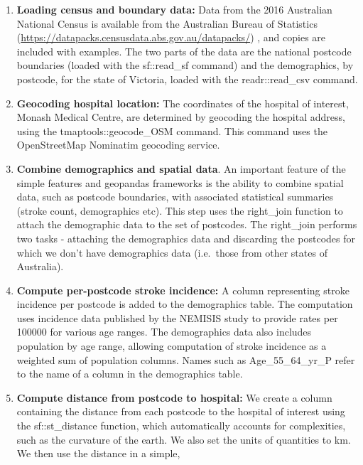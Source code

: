 \documentclass[utf8]{frontiersHLTH}
\begin{document}
\begin{table}[h]
\begin{center}
  \sffamily
  \tiny
\begin{enumerate}
\def\labelenumi{\arabic{enumi}.}
\item
  {\bf Loading census and boundary data:} Data from the 2016 Australian
  National Census is available from the Australian Bureau of Statistics
  (\url{https://datapacks.censusdata.abs.gov.au/datapacks/}) , and
  copies are included with examples. The two parts of the data are the
  national postcode boundaries (loaded with the sf::read\_sf command)
  and the demographics, by postcode, for the state of Victoria, loaded
  with the readr::read\_csv command.
\item
  {\bf Geocoding hospital location:} The coordinates of the hospital of
  interest, Monash Medical Centre, are determined by geocoding the
  hospital address, using the tmaptools::geocode\_OSM command. This
  command uses the OpenStreetMap Nominatim geocoding service.
\item
  {\bf Combine demographics and spatial data}. An important feature of the
  simple features and geopandas frameworks is the ability to combine
  spatial data, such as postcode boundaries, with associated statistical
  summaries (stroke count, demographics etc). This step uses the
  right\_join function to attach the demographic data to the set of
  postcodes. The right\_join performs two tasks - attaching the
  demographics data and discarding the postcodes for which we don't have
  demographics data (i.e.~those from other states of Australia).
\item
  {\bf Compute per-postcode stroke incidence:} A column representing stroke
  incidence per postcode is added to the demographics table. The
  computation uses incidence data published by the NEMISIS\cite{thrift_stroke_2000}
  study to provide rates per 100000 for various age ranges. The
  demographics data also includes population by age range, allowing
  computation of stroke incidence as a weighted sum of population
  columns. Names such as Age\_55\_64\_yr\_P refer to the name of a
  column in the demographics table.
\item
  {\bf Compute distance from postcode to hospital:} We create a column
  containing the distance from each postcode to the hospital of interest
  using the sf::st\_distance function, which automatically accounts for
  complexities, such as the curvature of the earth. We also set the
  units of quantities to km. We then use the distance in a simple,

\end{enumerate}
\end{center}
\end{table}
\end{document}
